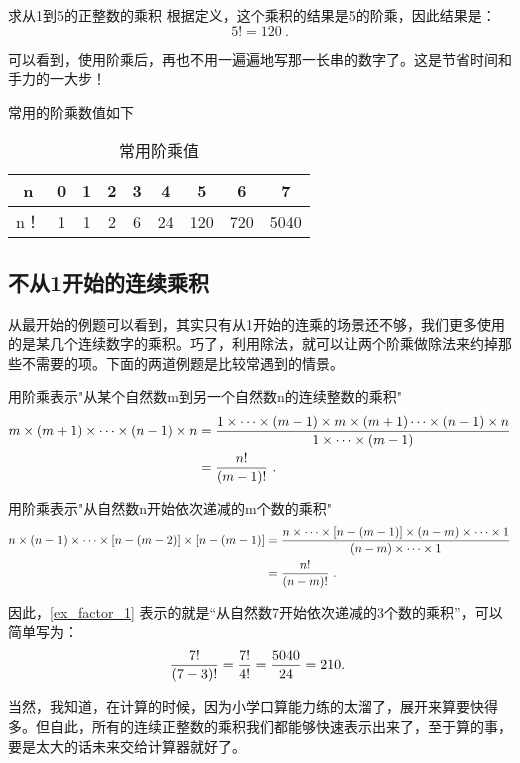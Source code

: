 \begin{example}{求从1到5的正整数的乘积}
根据定义，这个乘积的结果是5的阶乘，因此结果是：
$$5! = 120~.$$
\end{example}

可以看到，使用阶乘后，再也不用一遍遍地写那一长串的数字了。这是节省时间和手力的一大步！

常用的阶乘数值如下\begin{table}[ht]
\centering
\caption{常用阶乘值}\label{tab_factor1}
\begin{tabular}{|c|c|c|c|c|c|c|c|c|}
\hline
n & 0 & 1 & 2 & 3 & 4 & 5 & 6 & 7\\
\hline
n！ & 1 & 1 & 2 & 6 & 24 & 120 & 720 & 5040\\
\hline
\end{tabular}
\end{table}

\subsection{不从1开始的连续乘积}

从最开始的例题可以看到，其实只有从1开始的连乘的场景还不够，我们更多使用的是某几个连续数字的乘积。巧了，利用除法，就可以让两个阶乘做除法来约掉那些不需要的项。下面的两道例题是比较常遇到的情景。

\begin{example}{用阶乘表示"从某个自然数m到另一个自然数n的连续整数的乘积"}
\begin{align*}
m\times(m+1)\times\cdots \times(n-1)\times n&={1\times\cdots \times(m-1)\times m\times(m+1)\cdots \times(n-1)\times n\over 1\times\cdots \times(m-1)}\\
&={n!\over (m-1)!}~.
\end{align*}
\end{example}

\begin{example}{用阶乘表示"从自然数n开始依次递减的m个数的乘积"}
\begin{align*}
n\times(n-1)\times\cdots \times[n-(m-2)]\times [n-(m-1)]&={n\times\cdots \times [n-(m-1)]\times(n-m)\times\cdots\times1\over (n-m)\times\cdots \times1}\\
&={n!\over (n-m)!}~.
\end{align*}
\end{example}

因此，\autoref{ex_factor_1} 表示的就是“从自然数7开始依次递减的3个数的乘积”，可以简单写为：
$${7!\over (7-3)!}={7!\over 4!}={5040\over 24}=210.~$$

当然，我知道，在计算的时候，因为小学口算能力练的太溜了，展开来算要快得多。但自此，所有的连续正整数的乘积我们都能够快速表示出来了，至于算的事，要是太大的话未来交给计算器就好了。